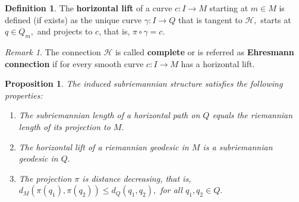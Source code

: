 \documentclass[12pt, letterpaper, reqno]{amsart}
\theoremstyle{definition}
\newtheorem{df}{Definition}
\theoremstyle{plain}
\newtheorem{prop}{Proposition}
\theoremstyle{remark}
\newtheorem{rem}{Remark}
\begin{document}
\begin{df}
	The \textbf{horizontal lift} of a curve $ c: I \rightarrow {M} $ starting at $ m\in M $ is defined (if exists) as the unique curve $ \gamma : I \rightarrow {Q} $ that is tangent to $ \mathcal{H}, $ starts at $ q\in Q_m, $ and projects to $c$, that is, $ \pi\circ\gamma = c. $ 
\end{df}

\begin{rem}
	The connection $ \mathcal{H} $ is called \textbf{complete} or is referred as \textbf{Ehresmann connection}  if for every smooth curve $ c: I \rightarrow {M} $ has a horizontal lift.
\end{rem}

\begin{prop}
	The induced subriemannian structure satisfies the following properties:
	\begin{enumerate}
		\item The subriemannian length of a horizontal path on $ Q $ equals the riemannian length of its projection to $ M. $ 
		\item The horizontal lift of a riemannian geodesic in $ M $ is a subriemannian geodesic in $ Q. $ 
		\item The projection $ \pi $ is distance decreasing, that is, $ d_M(\pi(q_1), \pi(q_2))\leq d_Q(q_1,q_2), $ for all $ q_1,q_2\in Q. $ 
	\end{enumerate}
\end{prop}
\end{document}
